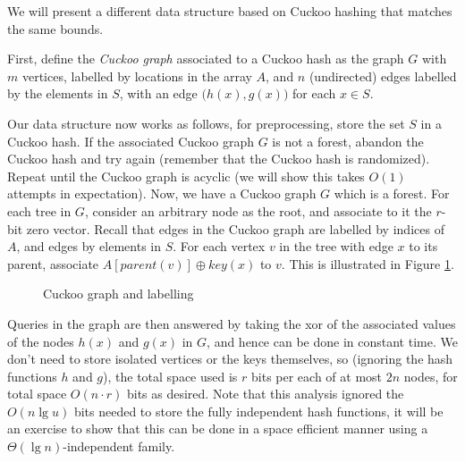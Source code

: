 \documentclass[11pt]{article}
\begin{document}
We will present a different data structure based on Cuckoo hashing that matches
the same bounds.

First, define the \emph{Cuckoo graph} associated to a Cuckoo hash as the graph
$G$ with $m$ vertices, labelled by locations in the array $A$, and $n$
(undirected) edges labelled by the elements in $S$, with an edge $\big(h(x),
g(x)\big)$ for each $x\in S$.

Our data structure now works as follows, for preprocessing, store the set $S$ in
a Cuckoo hash. If the associated Cuckoo graph $G$ is not a forest, abandon the
Cuckoo hash and try again (remember that the Cuckoo hash is randomized). Repeat
until the Cuckoo graph is acyclic (we will show this takes $O(1)$ attempts in
expectation). Now, we have a Cuckoo graph $G$ which is a forest. For each tree
in $G$, consider an arbitrary node as the root, and associate to it the $r$-bit
zero vector. Recall that edges in the Cuckoo graph are labelled by indices of
$A$, and edges by elements in $S$. For each vertex $v$ in the tree with edge $x$
to its parent, associate $A[parent(v)]\oplus key(x)$ to $v$. This is illustrated
in Figure \ref{fig:cuckoograph}.

\begin{figure}[htbp]
\centering
{}
\caption{Cuckoo graph and labelling}
\label{fig:cuckoograph}
\end{figure}

Queries in the graph are then answered by taking the xor of the associated
values of the nodes $h(x)$ and $g(x)$ in $G$, and hence can be done in constant
time.  We don't need to store isolated vertices or the keys themselves, so
(ignoring the hash functions $h$ and $g$), the total space used is $r$ bits
per each of at most $2n$ nodes, for total space $O(n\cdot r)$ bits as desired.
Note that this analysis ignored the $O(n\lg u)$ bits needed to store the fully
independent hash functions, it will be an exercise to show that this can be done
in a space efficient manner using a $\Theta(\lg n)$-independent family.
\end{document}
